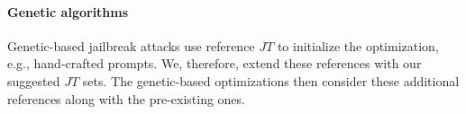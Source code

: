 \paragraph{Genetic algorithms}
Genetic-based jailbreak attacks use reference $JT$ to initialize the optimization, e.g., hand-crafted prompts. We, therefore, extend these references with our suggested $JT$ sets. The genetic-based optimizations then consider these additional references along with the pre-existing ones.









